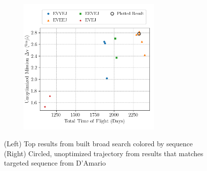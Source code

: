 \documentclass[letterpaper, preprint, paper,11pt]{AAS}	%
\begin{document}
\begin{figure}[htb]
    \begin{subfigure}
        \centering\includegraphics[width=2.75in]{./fig/galileoResults.png}
    \end{subfigure}
    \begin{subfigure}
        \centering
    \end{subfigure}
    \caption{(Left) Top results from built broad search colored by sequence\hspace{1em} (Right) Circled, unoptimized trajectory from results that matches targeted sequence from D'Amario \cite{DAmario1992}}
    \label{fig:galiResults}
\end{figure}
\end{document}
